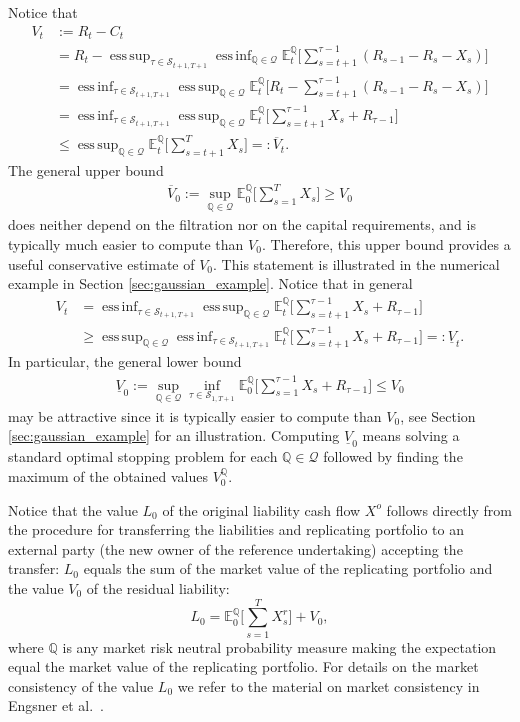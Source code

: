 \documentclass[11pt,a4paper]{article}
\newcommand{\E}{\mathbb{E}}
\DeclareMathOperator*{\esssup}{ess\,sup}
\DeclareMathOperator*{\essinf}{ess\,inf}
\newcommand{\Q}{\mathbb{Q}}
\newcommand{\calQ}{\mathcal{Q}}
\begin{document}
Notice that
\begin{align*}
V_t&:=R_t-C_t\\ 
&= R_t-\esssup_{\tau\in\mathcal{S}_{t+1,T+1}}\essinf_{\Q \in \calQ}\E_t^{\Q}\bigg[\sum_{s=t+1}^{\tau-1}(R_{s-1}-R_s-X_s)\bigg] \\
&=\essinf_{\tau\in\mathcal{S}_{t+1,T+1}}\esssup_{\Q \in \calQ}\E_t^{\Q}\bigg[R_t - \sum_{s=t+1}^{\tau-1}(R_{s-1}-R_s-X_s)\bigg] \\
&=\essinf_{\tau \in \mathcal{S}_{t+1,T+1}}\esssup_{\Q \in \calQ}\E_t^{\Q}\bigg[\sum_{s=t+1}^{\tau-1}X_s+R_{\tau-1}\bigg] \\
&\leq \esssup_{\Q \in \calQ}\E_t^{\Q}\bigg[\sum_{s=t+1}^{T}X_s\bigg]=:\overline{V}_t. 
\end{align*}
The general upper bound 
\begin{align}\label{eq:V0generalupperbound}
\overline{V}_0:=\sup_{\Q \in \calQ}\E_0^{\Q}\bigg[\sum_{s=1}^{T}X_s\bigg]\geq V_0
\end{align}
does neither depend on the filtration nor on the capital requirements, and is typically much easier to compute than $V_0$. Therefore, this upper bound provides a useful conservative estimate of $V_0$. This statement is illustrated in the numerical example in Section \ref{sec:gaussian_example}. 
Notice that in general
\begin{align}
V_t&=\essinf_{\tau \in \mathcal{S}_{t+1,T+1}}\esssup_{\Q \in \calQ}\E_t^{\Q}\bigg[\sum_{s=t+1}^{\tau-1}X_s+R_{\tau-1}\bigg] \nonumber \\
&\geq \esssup_{\Q \in \calQ}\essinf_{\tau \in \mathcal{S}_{t+1,T+1}}\E_t^{\Q}\bigg[\sum_{s=t+1}^{\tau-1}X_s+R_{\tau-1}\bigg] 
=: \underline{V}_t. \label{eq:Vtgenerallowerbound}
\end{align}
In particular, the general lower bound 
\begin{align}\label{eq:V0generallowerbound}
\underline{V}_0:=\sup_{\Q \in \calQ}\inf_{\tau \in \mathcal{S}_{1,T+1}}\E_0^{\Q}\bigg[\sum_{s=1}^{\tau-1}X_s+R_{\tau-1}\bigg]
\leq V_0
\end{align}
may be attractive since it is typically easier to compute than $V_0$, see Section \ref{sec:gaussian_example} for an illustration.  
Computing $\underline{V}_0$ means solving a standard optimal stopping problem for each $\Q\in\calQ$ followed by finding the maximum of the obtained values $V_0^{\Q}$. 

Notice that the value $L_0$ of the original liability cash flow $X^{o}$ follows directly from the procedure for transferring the liabilities and replicating portfolio to an external party (the new owner of the reference undertaking) accepting the transfer: $L_0$ equals the sum of the market value of the replicating portfolio and the value $V_0$ of the residual liability:
$$
L_0=\E_0^{\Q}\bigg[\sum_{s=1}^{T}X^{r}_s\bigg]+V_0,
$$ 
where $\Q$ is any market risk neutral probability measure making the expectation equal the market value of the replicating portfolio. For details on the market consistency of the value $L_0$ we refer to the material on market consistency in Engsner et al.~\cite{Engsner-Lindensjo-Lindskog-20}. 
\end{document}
